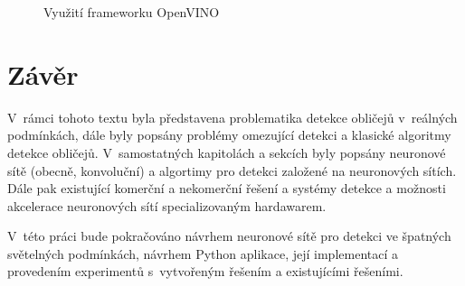 \begin{figure}[H]
  \begin{center}
  \label{obrazek:ovchart}
  \caption{Využití frameworku OpenVINO \cite{openvino}}
  \end{center}
\end{figure}

\chapter{Závěr}
\label{kapitola:zaver}
V~rámci tohoto textu byla představena problematika detekce obličejů v~reálných podmínkách, dále byly popsány problémy omezující detekci a klasické algoritmy detekce obličejů. V~samostatných kapitolách a sekcích byly popsány neuronové sítě (obecně, konvoluční) a algortimy pro detekci založené na neuronových sítích. Dále pak existující komerční a nekomerční řešení a systémy detekce a možnosti akcelerace neuronových sítí specializovaným hardawarem.

V~této práci bude pokračováno návrhem neuronové sítě pro detekci ve špatných světelných podmínkách, návrhem Python aplikace, její implementací a provedením experimentů s~vytvořeným řešením a existujícími řešeními.